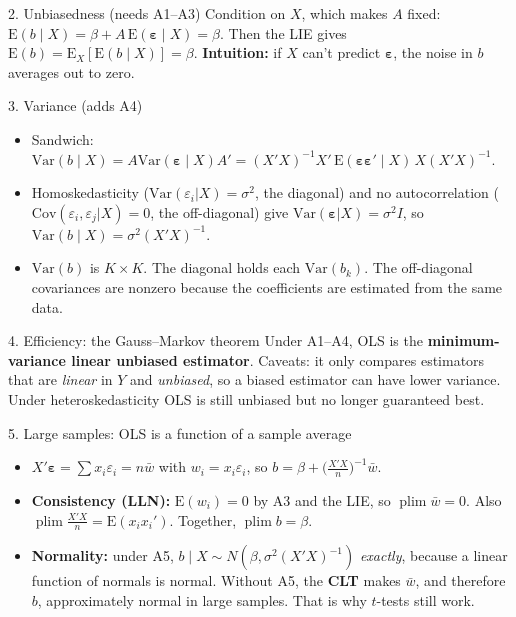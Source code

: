 \documentclass[10pt]{article}
\newcommand{\E}{\mathrm{E}}
\newcommand{\Var}{\mathrm{Var}}
\newcommand{\Cov}{\mathrm{Cov}}
\newcommand{\veps}{\bm{\varepsilon}}
\newcommand{\plim}{\operatorname*{plim}}
\begin{document}
\begin{topic}{2. Unbiasedness (needs A1--A3)}
Condition on $X$, which makes $A$ fixed: $\E(b\mid X)=\beta+A\,\E(\veps\mid X)=\beta$. Then the LIE gives $\E(b)=\E_X[\E(b\mid X)]=\beta$.
\textbf{Intuition:} if $X$ can't predict $\veps$, the noise in $b$ averages out to zero.
\end{topic}

\begin{topic}{3. Variance (adds A4)}
\begin{itemize}
\item Sandwich: $\Var(b\mid X)=A\Var(\veps\mid X)A'=(X'X)^{-1}X'\,\E(\veps\veps'\mid X)\,X(X'X)^{-1}$.
\item Homoskedasticity ($\Var(\varepsilon_i|X)=\sigma^2$, the diagonal) and no autocorrelation ($\Cov(\varepsilon_i,\varepsilon_j|X)=0$, the off-diagonal) give $\Var(\veps|X)=\sigma^2I$, so $\Var(b\mid X)=\sigma^2(X'X)^{-1}$.
\item $\Var(b)$ is $K\times K$. The diagonal holds each $\Var(b_k)$. The off-diagonal covariances are nonzero because the coefficients are estimated from the same data.
\end{itemize}
\end{topic}

\begin{topic}{4. Efficiency: the Gauss--Markov theorem}
Under A1--A4, OLS is the \textbf{minimum-variance linear unbiased estimator}. Caveats: it only compares estimators that are \emph{linear} in $Y$ and \emph{unbiased}, so a biased estimator can have lower variance. Under heteroskedasticity OLS is still unbiased but no longer guaranteed best.
\end{topic}

\begin{topic}{5. Large samples: OLS is a function of a sample average}
\begin{itemize}
\item $X'\veps=\sum x_i\varepsilon_i=n\bar w$ with $w_i=x_i\varepsilon_i$, so $b=\beta+\big(\tfrac{X'X}{n}\big)^{-1}\bar w$.
\item \textbf{Consistency (LLN):} $\E(w_i)=0$ by A3 and the LIE, so $\plim\bar w=0$. Also $\plim\frac{X'X}{n}=\E(x_ix_i')$. Together, $\plim b=\beta$.
\item \textbf{Normality:} under A5, $b\mid X\sim N(\beta,\sigma^2(X'X)^{-1})$ \emph{exactly}, because a linear function of normals is normal. Without A5, the \textbf{CLT} makes $\bar w$, and therefore $b$, approximately normal in large samples. That is why $t$-tests still work.
\end{itemize}
\end{topic}
\end{document}
